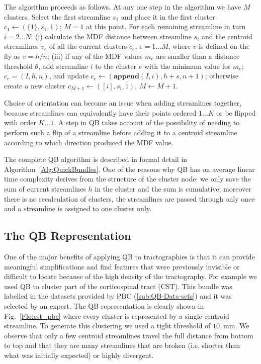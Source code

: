 \documentclass{bioinfo}
\begin{document}
\begin{methods}
The algorithm proceeds as follows.  At any one step in the algorithm we
have $M$ clusters. Select the first streamline $s_{1}$ and place it in
the first cluster $c_{1}\leftarrow(\{1\}, s_{1},1)$; $M=1$ at this
point.  For each remaining streamline in turn $i = 2 \dots N$: (i)
calculate the MDF distance between streamline $s_{i}$ and the centroid
streamlines $v_{e}$ of all the current clusters $c_{e}$, $e = 1 \dots
M$, where $v$ is defined on the fly as $v=h/n$; (iii) if any of the MDF
values $m_{e}$ are smaller than a distance threshold $\theta$, add
streamline $i$ to the cluster $e$ with the minimum value for $m_{e}$;
$c_{e}=(I,h,n)$, and update $c_{e}\leftarrow(\mathbf{append}(I,i), h+s,
n+1)$; otherwise create a new cluster $c_{M+1}\leftarrow([i],s_{i},1)$,
$M\leftarrow M+1$.

Choice of orientation can become an issue when adding streamlines
together, because streamlines can equivalently have their points ordered
$1 \dots K$ or be flipped with order $K \dots 1$.  A step in QB takes
account of the possibility of needing to perform such a flip of a
streamline before adding it to a centroid streamline according to which
direction produced the MDF value.

The complete QB algorithm is described in formal detail in
Algorithm~\ref{Alg:QuickBundles}.  One of the reasons why
QB has on average linear time complexity derives from the structure of
the cluster node: we only save the sum of current streamlines
$h$ in the cluster and the sum is cumulative; moreover there is
no recalculation of clusters, the streamlines are passed through only
once and a streamline is assigned to one cluster only.

\subsection{The QB Representation\label{QB_Representation}}

One of the major benefits of applying QB to tractographies is that it
can provide meaningful simplifications and find features that were
previously invisible or difficult to locate because of the high density
of the tractography. For example we used QB to cluster part of the
corticospinal tract (CST). This bundle was labelled in the datasets
provided by PBC (\ref{sub:QB-Data-sets}) and it was selected by an
expert. The QB representation is clearly shown in Fig.~\ref{Flo:cst_pbc}
where every cluster is represented by a single centroid streamline. To
generate this clustering we used a tight threshold of $10$~mm. We
observe that only a few centroid streamlines travel the full distance
from bottom to top and that they are many streamlines that are broken
(i.e. shorter than what was initially expected) or highly divergent.


\end{methods}
\end{document}
